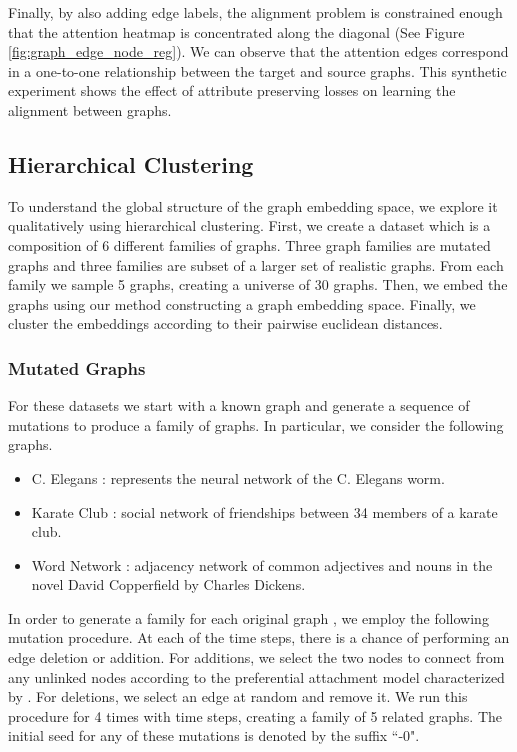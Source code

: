 \documentclass[sigconf]{acmart}
\begin{document}
Finally, by also adding edge labels, the alignment problem is constrained enough that the attention heatmap is concentrated along the diagonal (See Figure \ref{fig:graph_edge_node_reg}).
We can observe that the attention edges correspond in a one-to-one relationship between the target and source graphs.
This synthetic experiment shows the effect of attribute preserving losses on learning the alignment between graphs.


\subsection{Hierarchical Clustering}
To understand the global structure of the graph embedding space, we explore it qualitatively using hierarchical clustering.
First, we create a dataset which is a composition of 6 different families of graphs.
Three graph families are mutated graphs and three families are subset of a larger set of realistic graphs.
From each family we sample 5 graphs, creating a universe of 30 graphs.
Then, we embed the graphs using our method constructing a graph embedding space.
Finally, we cluster the embeddings according to their pairwise euclidean distances.

\subsubsection{Mutated Graphs}
For these datasets we start with a known graph and generate a sequence of mutations to produce a family of graphs.
In particular, we consider the following graphs.

\begin{itemize}
     \item C. Elegans \cite{watts1998collective}: represents the neural network of the C. Elegans worm.
     \item Karate Club \cite{ZacharyKarate}: social network of friendships between 34 members of a karate club.
     \item Word Network \cite{NewmanWordNetwork}: adjacency network of common adjectives and nouns in the novel David Copperfield by Charles Dickens.
 \end{itemize}

In order to generate a family  for each original graph , we employ the following mutation procedure.
At each of the  time steps, there is a  chance of performing an edge deletion or addition.
For additions, we select the two nodes to connect from any unlinked nodes according to the preferential attachment model characterized by  \cite{chung2006complex}.
For deletions, we select an edge at random and remove it.
We run this procedure for 4 times with  time steps, creating a family of 5 related graphs.
The initial seed for any of these mutations is denoted by the suffix ``-0".
\end{document}
